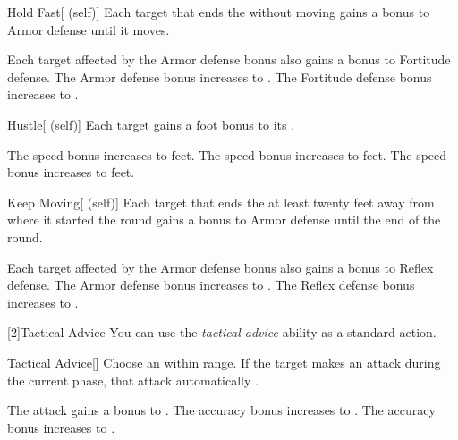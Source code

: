 {            \begin{attuneability}{Hold Fast}[ (self)]
                Each target that ends the  without moving gains a  bonus to Armor defense until it moves.

                \rankline
                 Each target affected by the Armor defense bonus also gains a  bonus to Fortitude defense.
                 The Armor defense bonus increases to .
                 The Fortitude defense bonus increases to .
            \end{attuneability}

            \begin{attuneability}{Hustle}[ (self)]
                Each target gains a  foot bonus to its .

                \rankline
                 The speed bonus increases to  feet.
                 The speed bonus increases to  feet.
                 The speed bonus increases to  feet.
            \end{attuneability}

            \begin{attuneability}{Keep Moving}[ (self)]
                Each target that ends the  at least twenty feet away from where it started the round gains a  bonus to Armor defense until the end of the round.

                \rankline
                 Each target affected by the Armor defense bonus also gains a  bonus to Reflex defense.
                 The Armor defense bonus increases to .
                 The Reflex defense bonus increases to .
            \end{attuneability}
        }

        [2]{Tactical Advice} You can use the \textit{tactical advice} ability as a standard action.
        \begin{freeability}{Tactical Advice}[]
            Choose an  within \rngmed range.
            If the target makes an attack during the current phase, that attack automatically .

            \rankline
             The attack gains a  bonus to .
             The accuracy bonus increases to .
             The accuracy bonus increases to .
        \end{freeability}

